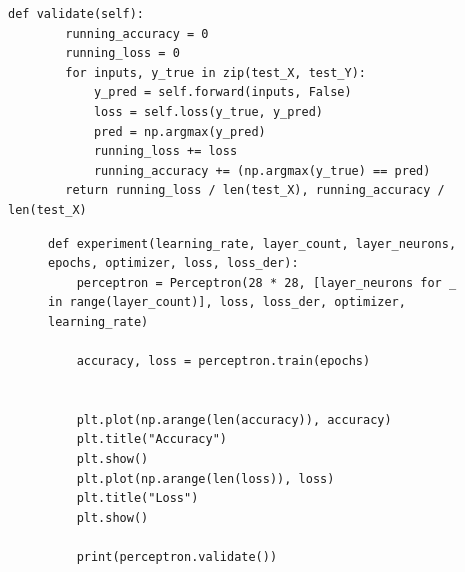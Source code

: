 \documentclass[a4paper, 14pt]{extarticle}
\begin{document}
\begin{lstlisting}[language={},caption={Класс перцептрона},label={lst:code5}, breaklines=true]
    def validate(self):
        running_accuracy = 0
        running_loss = 0
        for inputs, y_true in zip(test_X, test_Y):
            y_pred = self.forward(inputs, False)
            loss = self.loss(y_true, y_pred)
            pred = np.argmax(y_pred)
            running_loss += loss
            running_accuracy += (np.argmax(y_true) == pred)
        return running_loss / len(test_X), running_accuracy / len(test_X)
\end{lstlisting}


\begin{figure}[H]
\begin{lstlisting}[language={},caption={Функция эксперимента},label={lst:code6}]
def experiment(learning_rate, layer_count, layer_neurons, epochs, optimizer, loss, loss_der):
    perceptron = Perceptron(28 * 28, [layer_neurons for _ in range(layer_count)], loss, loss_der, optimizer, learning_rate)

    accuracy, loss = perceptron.train(epochs)


    plt.plot(np.arange(len(accuracy)), accuracy)
    plt.title("Accuracy")
    plt.show()
    plt.plot(np.arange(len(loss)), loss)
    plt.title("Loss")
    plt.show()

    print(perceptron.validate())
\end{lstlisting}
\end{figure}
\end{document}
